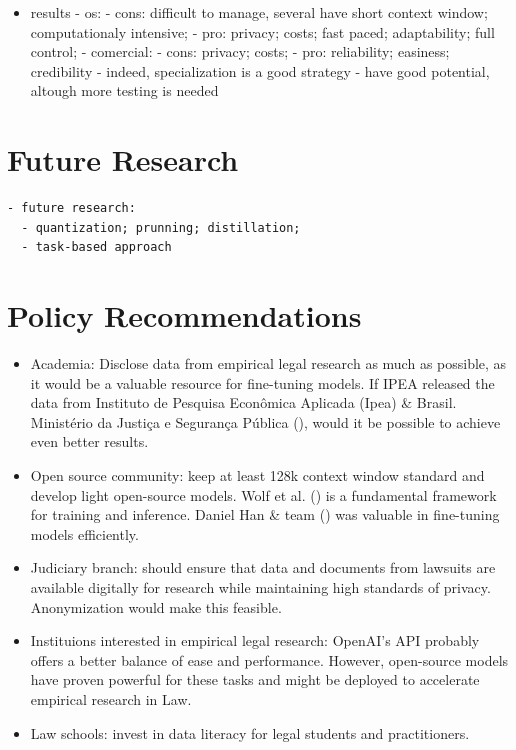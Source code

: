 \documentclass[
  12pt,
  letterpaper,
]{book}
\providecommand{\tightlist}{%
  \setlength{\itemsep}{0pt}\setlength{\parskip}{0pt}}\usepackage{longtable,booktabs,array}
\begin{document}
\begin{itemize}
\tightlist
\item
  results - os: - cons: difficult to manage, several have short context
  window; computationaly intensive; - pro: privacy; costs; fast paced;
  adaptability; full control; - comercial: - cons: privacy; costs; -
  pro: reliability; easiness; credibility - indeed, specialization is a
  good strategy - have good potential, altough more testing is needed
\end{itemize}

\section{Future Research}\label{future-research}

\begin{verbatim}
- future research:
  - quantization; prunning; distillation;
  - task-based approach
\end{verbatim}

\section{Policy Recommendations}\label{policy-recommendations}

\begin{itemize}
\item
  Academia: Disclose data from empirical legal research as much as
  possible, as it would be a valuable resource for fine-tuning models.
  If IPEA released the data from Instituto de Pesquisa Econômica
  Aplicada (Ipea) \& Brasil. Ministério da Justiça e Segurança Pública
  (),
  would it be possible to achieve even better results.
\item
  Open source community: keep at least 128k context window standard and
  develop light open-source models. Wolf et al.
  () is a fundamental
  framework for training and inference. Daniel Han \& team
  () was valuable in
  fine-tuning models efficiently.
\item
  Judiciary branch: should ensure that data and documents from lawsuits
  are available digitally for research while maintaining high standards
  of privacy. Anonymization would make this feasible.
\item
  Instituions interested in empirical legal research: OpenAI's API
  probably offers a better balance of ease and performance. However,
  open-source models have proven powerful for these tasks and might be
  deployed to accelerate empirical research in Law.
\item
  Law schools: invest in data literacy for legal students and
  practitioners.
\end{itemize}
\end{document}
